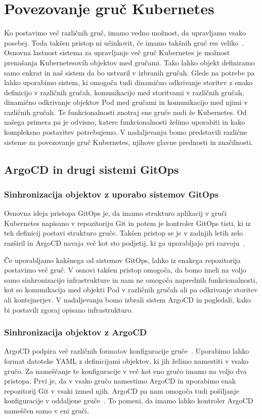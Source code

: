 \documentclass[a4paper, 12pt]{book}
\begin{document}
\chapter{Povezovanje gruč Kubernetes}
Ko postavimo več različnih gruč, imamo vedno možnost, da upravljamo vsako posebej.
Toda takšen pristop ni učinkovit, če imamo takšnih gruč res veliko~\cite{difference-multi-cluster}.
Osnovna lastnost sistema za upravljanje več gruč Kubernetes je možnost prenašanja Kubernetesovih objektov med gručami.
Tako lahko objekt definiramo samo enkrat in naš sistem da bo ustvaril v izbranih gručah.
Glede na potrebe pa lahko uporabimo sistem, ki omogoča tudi dinamično odkrivanje storitev z enako definicijo v različnih gručah, komunikacijo med storitvami v različnih gručah, dinamično odkrivanje objektov Pod med gručami in komunikacijo med njimi v različnih gručah.
Te funkcionalnosti znotraj ene gruče nudi že Kubernetes.
Od našega primera pa je odvisno, katere funkcionalnosti želimo uporabiti in kako kompleksno postavitev potrebujemo.
V nadaljevanju bomo predstavili različne sisteme za povezovanje gruč Kubernetes, njihove glavne prednosti in značilnosti.
\section{ArgoCD in drugi sistemi GitOps}
\subsection{Sinhronizacija objektov z uporabo sistemov GitOps}
Osnovna ideja pristopa GitOps je, da imamo strukturo aplikacij v gruči Kubernetes napisano v repozitoriju Git in potem je kontroler GitOps tisti, ki iz teh definicij postavi strukturo gruče.
Takšen pristop se je v zadnjih letih zelo razširil in ArgoCD navaja več kot sto podjetij, ki ga uporabljajo pri razvoju~\cite{argocd-user-list}.

Če uporabljamo kakšnega od sistemov GitOps, lahko iz enakega repozitorija postavimo več gruč.
V osnovi takšen pristop omogoča, da bomo imeli na voljo samo sinhronizacijo infrastrukture in nam ne omogoča naprednih funkcionalnosti, kot so komunikacija med objekti Pod v različnih gručah ali pa odkrivanje storitev ali kontejnerjev.
V nadaljevanju bomo izbrali sistem ArgoCD in pogledali, kako bi postavili zgoraj opisano infrastrukturo.
\subsection{Sinhronizacija objektov z ArgoCD}
ArgoCD podpira več različnih formatov konfiguracije gruče~\cite{argocd-docs}.
Uporabimo lahko format datoteke YAML z definicijami objektov, ki jih želimo namestiti v vsako gručo.
Za nameščanje te konfiguracije v več kot eno gručo imamo na voljo dva pristopa.
Prvi je, da v vsako gručo namestimo ArgoCD in uporabimo enak repozitorij Git v vsaki izmed njih.
ArgoCD pa nam omogoča tudi pošiljanje konfiguracije v oddaljene gruče~\cite{declarative-setup}.
To pomeni, da imamo lahko kontroler ArgoCD nameščen samo v eni gruči.
\end{document}
